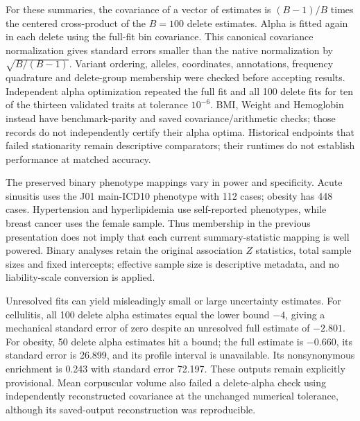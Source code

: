 \documentclass[11pt]{article}
\begin{document}
\begin{table}[H]
\centering
\small

\caption{Validated baseline-LD results for thirteen traits. Enrichment refers to nonsynonymous variants. Parentheses give standard errors from 100 ordered one-step delete groups. Alpha fits use the fixed full-fit covariance and exact frequency quadrature; numerical checks do not assess uncertainty calibration. All fits shown passed the unpenalized local stationarity and information checks. The twenty unresolved outcomes are retained in the aggregate source table.}
\label{tab:cohort}
\end{table}

For these summaries, the covariance of a vector of estimates is $(B-1)/B$ times the centered cross-product of the $B=100$ delete estimates. Alpha is fitted again in each delete using the full-fit bin covariance. This canonical covariance normalization gives standard errors smaller than the native normalization by $\sqrt{B/(B-1)}$. Variant ordering, alleles, coordinates, annotations, frequency quadrature and delete-group membership were checked before accepting results. Independent alpha optimization repeated the full fit and all 100 delete fits for ten of the thirteen validated traits at tolerance $10^{-6}$. BMI, Weight and Hemoglobin instead have benchmark-parity and saved covariance/arithmetic checks; those records do not independently certify their alpha optima. Historical endpoints that failed stationarity remain descriptive comparators; their runtimes do not establish performance at matched accuracy.

The preserved binary phenotype mappings vary in power and specificity. Acute sinusitis uses the J01 main-ICD10 phenotype with 112 cases; obesity has 448 cases. Hypertension and hyperlipidemia use self-reported phenotypes, while breast cancer uses the female sample. Thus membership in the previous presentation does not imply that each current summary-statistic mapping is well powered. Binary analyses retain the original association $Z$ statistics, total sample sizes and fixed intercepts; effective sample size is descriptive metadata, and no liability-scale conversion is applied.

Unresolved fits can yield misleadingly small or large uncertainty estimates. For cellulitis, all 100 delete alpha estimates equal the lower bound $-4$, giving a mechanical standard error of zero despite an unresolved full estimate of $-2.801$. For obesity, 50 delete alpha estimates hit a bound; the full estimate is $-0.660$, its standard error is 26.899, and its profile interval is unavailable. Its nonsynonymous enrichment is 0.243 with standard error 72.197. These outputs remain explicitly provisional. Mean corpuscular volume also failed a delete-alpha check using independently reconstructed covariance at the unchanged numerical tolerance, although its saved-output reconstruction was reproducible.
\end{document}
